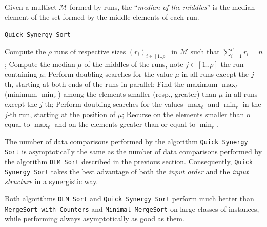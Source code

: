 \begin{INUTILE}
  \begin{definition}
    Given a multiset $\mathcal{M}$ formed by runs, the ``\emph{median
      of the middles}'' is the median element of the set formed by the
    middle elements of each run.
  \end{definition}
\end{INUTILE}
\begin{algorithm} %
  \caption{\texttt{Quick Synergy Sort}} %
  \label{alg:qss} %
  \begin{algorithmic}[1] %

     

    \STATE Compute the $\rho$ runs of respective sizes
    $(r_i)_{i\in[1..\rho]}$ in $\mathcal{M}$ such that
    $\sum^{\rho}_{i=1} r_i = n$;
    \STATE Compute the median $\mu$ of
    the middles of the runs, note $j\in[1..\rho]$ the run containing
    $\mu$;
    \STATE Perform doubling searches for the value $\mu$ in all
    runs except the $j$-th, starting at both ends of the runs in
    parallel;
    \STATE Find the maximum $\max_\ell$ (minimum $\min_r$)
    among the elements smaller (resp., greater) than $\mu$ in all runs
    except the $j$-th;
    \STATE Perform doubling searches for the values
    $\max_\ell$ and $\min_r$ in the $j$-th run, starting at the
    position of $\mu$;
    \STATE Recurse on the elements smaller than o
    equal to $\max_\ell$ and on the elements greater than or equal to
    $\min_r$.
  \end{algorithmic}
\end{algorithm}

The number of data comparisons performed by the algorithm
\texttt{Quick Synergy Sort} is asymptotically the same as the number
of data comparisons performed by the algorithm \texttt{DLM Sort}
described in the previous section. Consequently, \texttt{Quick
  Synergy Sort} takes the best advantage of both the \emph{input order} and
the \emph{input structure} in a synergistic way.

Both algorithms \texttt{DLM Sort} and \texttt{Quick Synergy Sort}
perform much better than \texttt{MergeSort with Counters} and
\texttt{Minimal MergeSort} on large classes of instances, while
performing always asymptotically as good as them.

